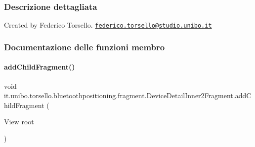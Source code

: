 \subsubsection{Descrizione dettagliata}
Created by Federico Torsello. \href{mailto:federico.torsello@studio.unibo.it}{\tt federico.\+torsello@studio.\+unibo.\+it} 

\subsubsection{Documentazione delle funzioni membro}
\hypertarget{classit_1_1unibo_1_1torsello_1_1bluetoothpositioning_1_1fragment_1_1DeviceDetailInner2Fragment_af61900b6821dff2086e86d646c990870_af61900b6821dff2086e86d646c990870}{}\label{classit_1_1unibo_1_1torsello_1_1bluetoothpositioning_1_1fragment_1_1DeviceDetailInner2Fragment_af61900b6821dff2086e86d646c990870_af61900b6821dff2086e86d646c990870} 
\paragraph{\texorpdfstring{add\+Child\+Fragment()}{addChildFragment()}}
{\footnotesize\ttfamily void it.\+unibo.\+torsello.\+bluetoothpositioning.\+fragment.\+Device\+Detail\+Inner2\+Fragment.\+add\+Child\+Fragment (\begin{DoxyParamCaption}\item[{View}]{root }\end{DoxyParamCaption})\hspace{0.3cm}{\ttfamily [private]}}


